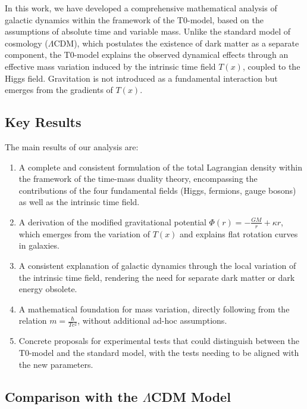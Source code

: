 \documentclass[a4paper,12pt]{article}
\newcommand{\Tfield}{T(x)}
\begin{document}
	In this work, we have developed a comprehensive mathematical analysis of galactic dynamics within the framework of the T0-model, based on the assumptions of absolute time and variable mass. Unlike the standard model of cosmology (\(\Lambda\)CDM), which postulates the existence of dark matter as a separate component, the T0-model explains the observed dynamical effects through an effective mass variation induced by the intrinsic time field \( \Tfield \), coupled to the Higgs field. Gravitation is not introduced as a fundamental interaction but emerges from the gradients of \( \Tfield \).
	
	\subsection{Key Results}
	
	The main results of our analysis are:
	
	\begin{enumerate}
		\item A complete and consistent formulation of the total Lagrangian density within the framework of the time-mass duality theory, encompassing the contributions of the four fundamental fields (Higgs, fermions, gauge bosons) as well as the intrinsic time field.
		
		\item A derivation of the modified gravitational potential \( \Phi(r) = -\frac{G M}{r} + \kappa r \), which emerges from the variation of \( \Tfield \) and explains flat rotation curves in galaxies.
		
		\item A consistent explanation of galactic dynamics through the local variation of the intrinsic time field, rendering the need for separate dark matter or dark energy obsolete.
		
		\item A mathematical foundation for mass variation, directly following from the relation \( m = \frac{\hbar}{T c^2} \), without additional ad-hoc assumptions.
		
		\item Concrete proposals for experimental tests that could distinguish between the T0-model and the standard model, with the tests needing to be aligned with the new parameters.
	\end{enumerate}
	
	\subsection{Comparison with the $\Lambda$CDM Model}
	
\end{document}
